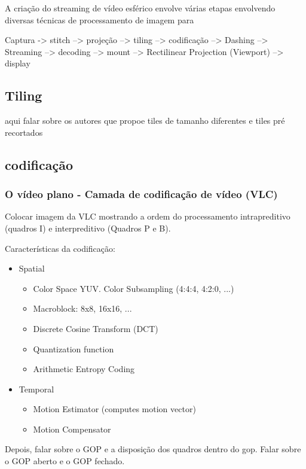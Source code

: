 A criação do streaming de vídeo esférico envolve várias etapas envolvendo diversas técnicas de processamento de imagem para

Captura -> stitch --> projeção --> tiling --> codificação -->  Dashing --> Streaming --> decoding --> mount --> Rectilinear Projection (Viewport) --> display

\subsection{Tiling}
aqui falar sobre os autores que propoe tiles de tamanho diferentes e tiles pré recortados

\subsection{codificação}

\subsubsection{O vídeo plano - Camada de codificação de vídeo (VLC)}

Colocar imagem da VLC mostrando a ordem do processamento intrapreditivo (quadros I) e interpreditivo (Quadros P e B).

Características da codificação:

\begin{itemize}
	\item Spatial
	\begin{itemize}
		\item Color Space YUV. Color Subsampling (4:4:4, 4:2:0, ...)
		\item Macroblock: 8x8, 16x16, ...
		\item Discrete Cosine Transform (DCT)
		\item Quantization function
		\item Arithmetic Entropy Coding
	\end{itemize}
	\item Temporal
	\begin{itemize}
		\item Motion Estimator (computes motion vector)
		\item Motion Compensator
	\end{itemize}
\end{itemize}

Depois, falar sobre o GOP e a disposição dos quadros dentro do gop. Falar sobre o GOP aberto e o GOP fechado.

